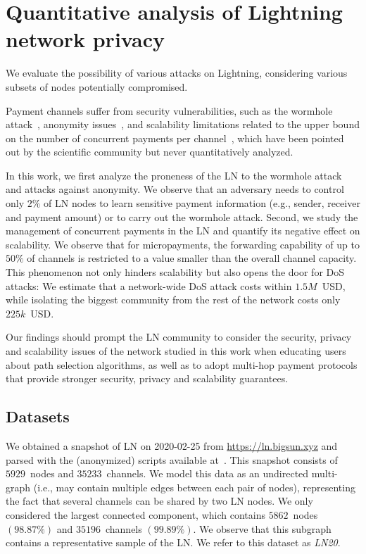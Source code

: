 \chapter{Quantitative analysis of Lightning network privacy}

\label{Chapter07LNattacks}

We evaluate the possibility of various attacks on Lightning, considering various subsets of nodes potentially compromised.

Payment channels suffer from security vulnerabilities, such as the wormhole attack~\cite{Malavolta2019}, anonymity issues~\cite{Malavolta2017}, and scalability limitations related to  the upper bound on the number of concurrent payments per channel~\cite{EmelyanenkoK2017}, which have been pointed out by the scientific community but never quantitatively analyzed. 

In this work, we first analyze the proneness of the LN to the wormhole attack and attacks against anonymity. 
We observe that an adversary needs to control only $2\%$ of LN nodes to learn sensitive payment information (e.g., sender, receiver and payment amount) or to carry out the wormhole attack. 
Second, we study the management of concurrent payments in the LN and quantify its negative effect on scalability. 
We observe that for micropayments, the forwarding capability of up to $50\%$ of channels is restricted to 
a value smaller than the overall channel capacity.
This phenomenon not only hinders scalability but also opens the door for DoS attacks: We estimate that 
a network-wide DoS attack costs within $1.5M$~USD, while isolating the biggest community from the rest of the network costs only $225k$~USD.

Our findings should prompt the LN community to consider the security, privacy and scalability issues of the network studied in this work 
when educating users about path selection algorithms, as well as to adopt multi-hop payment protocols that provide stronger security, privacy and 
scalability guarantees. 

\section{Datasets}
\label{sec:datasets}



We obtained a snapshot of LN on 2020-02-25 from \url{https://ln.bigsun.xyz} and parsed with the (anonymized) scripts available at~\cite{Tikhomirov2019}.
This snapshot consists of $5929$~nodes and $35233$~channels.
We model this data as an undirected multi-graph (i.e., may contain multiple edges between each pair of nodes), 
representing the fact that several channels can be shared by two LN nodes.
We only considered the largest connected component, 
which contains $5862$~nodes $(98.87\%)$ and $35196$~channels $(99.89\%)$.
We observe that this subgraph contains a representative sample of the LN.
We refer to this dataset as \emph{LN20}.


